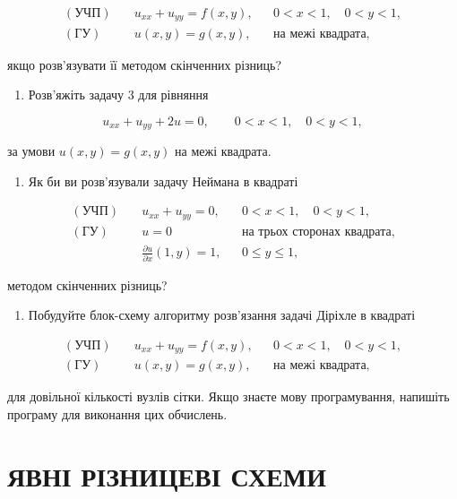 \documentclass[
  ukrainian,
]{article}
\providecommand{\tightlist}{%
  \setlength{\itemsep}{0pt}\setlength{\parskip}{0pt}}
\begin{document}
\[\begin{aligned}(\text{УЧП})\quad & u_{xx}+u_{yy}=f(x,y), && 0<x<1,\quad 0<y<1,\\(\text{ГУ})\quad & u(x,y)=g(x,y), && \text{на межі квадрата},\end{aligned}\]

якщо розв'язувати її методом скінченних різниць?

\begin{enumerate}
\def\labelenumi{\arabic{enumi}.}
\setcounter{enumi}{3}
\tightlist
\item
  Розв'яжіть задачу 3 для рівняння
\end{enumerate}

\[u_{xx}+u_{yy}+2u=0,\qquad 0<x<1,\quad 0<y<1,\]

за умови \(u(x,y)=g(x,y)\) на межі квадрата.

\begin{enumerate}
\def\labelenumi{\arabic{enumi}.}
\setcounter{enumi}{4}
\tightlist
\item
  Як би ви розв'язували задачу Неймана в квадраті
\end{enumerate}

\[\begin{aligned}(\text{УЧП})\quad & u_{xx}+u_{yy}=0, && 0<x<1,\quad 0<y<1,\\(\text{ГУ})\quad & u=0 && \text{на трьох сторонах квадрата},\\& \frac{\partial u}{\partial x}(1,y)=1, && 0\le y\le 1,\end{aligned}\]

методом скінченних різниць?

\begin{enumerate}
\def\labelenumi{\arabic{enumi}.}
\setcounter{enumi}{5}
\tightlist
\item
  Побудуйте блок-схему алгоритму розв'язання задачі Діріхле в квадраті
\end{enumerate}

\[\begin{aligned}(\text{УЧП})\quad & u_{xx}+u_{yy}=f(x,y), && 0<x<1,\quad 0<y<1,\\(\text{ГУ})\quad & u(x,y)=g(x,y), && \text{на межі квадрата},\end{aligned}\]

для довільної кількості вузлів сітки. Якщо знаєте мову програмування,
напишіть програму для виконання цих обчислень.

\section{ЯВНІ РІЗНИЦЕВІ
СХЕМИ}\label{ux44fux432ux43dux456-ux440ux456ux437ux43dux438ux446ux435ux432ux456-ux441ux445ux435ux43cux438}
\end{document}

